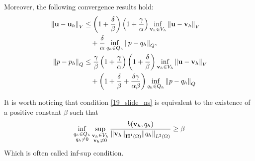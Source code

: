 \begin{theorem}
\begin{itemize}
        Moreover, the following convergence results hold:
        \begin{align*}
            \norm{\textbf{u} - \textbf{u}_h}_V &\leq \left( 1 +\frac{\delta}{\beta} \right) \left( 1 + \frac{\gamma}{\alpha} \right) \inf_{\textbf{v}_h \in V_h} \norm{\textbf{u} - \textbf{v}_h}_V \\
            &\quad + \frac{\delta}{\alpha} \inf_{q_h \in Q_h} \norm{p - q_h}_Q, \\
            \norm{p-p_h}_Q &\leq \frac{\gamma}{\beta} \left( 1+\frac{\gamma}{\alpha} \right)\left(1 +\frac{\delta}{\beta} \right) \inf_{\textbf{v}_h \in V_h} \norm{\textbf{u} -\textbf{v}_h}_V \\
            &\quad + \left( 1 + \frac{\delta}{\beta} + \frac{\delta \gamma}{\alpha \beta} \right) \inf_{q_h \in Q_h} \norm{p-q_h}_Q
        \end{align*}
    \end{itemize}
\end{theorem}
It is worth noticing that condition \eqref{19_slide_ns} is equivalent to the existence of a positive constant \(\beta\) such that
\begin{equation}
    \inf_{\substack{q_h \in Q_h \\ q_h \neq 0}} \sup_{\substack{\textbf{v}_h \in V_h \\ \textbf{v}_h \neq 0}} \frac{b(\textbf{v}_h, q_h)}{\norm{\textbf{v}_h}_{\textbf{H}^1(\Omega)}\norm{q_h}_{L^2(\Omega)}} \geq \beta
    \label{20_slide_ns}
\end{equation}
Which is often called inf-sup condition. 
